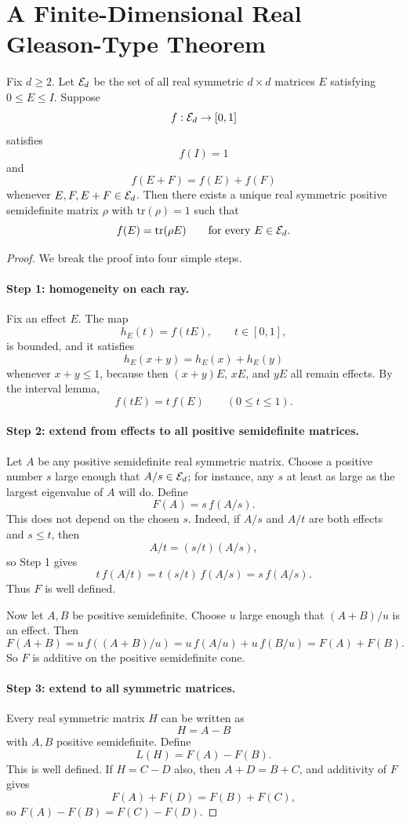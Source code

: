 \section{A Finite-Dimensional Real Gleason-Type Theorem}

\begin{theorem}
Fix $d\ge 2$. Let $\mathcal{E}_d$ be the set of all real symmetric $d\times d$ matrices $E$ satisfying $0\le E\le I$. Suppose
\[
f:\mathcal{E}_d\to [0,1]
\]
satisfies
\[
f(I)=1
\]
and
\[
f(E+F)=f(E)+f(F)
\]
whenever $E,F,E+F\in \mathcal{E}_d$. Then there exists a unique real symmetric positive semidefinite matrix $\rho$ with $\mathrm{tr}(\rho)=1$ such that
\[
f(E)=\mathrm{tr}(\rho E)
\qquad\text{for every }E\in \mathcal{E}_d.
\]
\end{theorem}

\begin{proof}
We break the proof into four simple steps.

\paragraph{Step 1: homogeneity on each ray.}
Fix an effect $E$. The map
\[
h_E(t)=f(tE),\qquad t\in[0,1],
\]
is bounded, and it satisfies
\[
h_E(x+y)=h_E(x)+h_E(y)
\]
whenever $x+y\le 1$, because then $(x+y)E$, $xE$, and $yE$ all remain effects. By the interval lemma,
\[
f(tE)=t\,f(E)\qquad (0\le t\le 1).
\]

\paragraph{Step 2: extend from effects to all positive semidefinite matrices.}
Let $A$ be any positive semidefinite real symmetric matrix. Choose a positive number $s$ large enough that $A/s\in\mathcal{E}_d$; for instance, any $s$ at least as large as the largest eigenvalue of $A$ will do. Define
\[
F(A)=s\,f(A/s).
\]
This does not depend on the chosen $s$. Indeed, if $A/s$ and $A/t$ are both effects and $s\le t$, then
\[
A/t=(s/t)(A/s),
\]
so Step 1 gives
\[
t\,f(A/t)=t\,(s/t)\,f(A/s)=s\,f(A/s).
\]
Thus $F$ is well defined.

Now let $A,B$ be positive semidefinite. Choose $u$ large enough that $(A+B)/u$ is an effect. Then
\[
F(A+B)=u\,f((A+B)/u)=u\,f(A/u)+u\,f(B/u)=F(A)+F(B).
\]
So $F$ is additive on the positive semidefinite cone.

\paragraph{Step 3: extend to all symmetric matrices.}
Every real symmetric matrix $H$ can be written as
\[
H=A-B
\]
with $A,B$ positive semidefinite. Define
\[
L(H)=F(A)-F(B).
\]
This is well defined. If $H=C-D$ also, then $A+D=B+C$, and additivity of $F$ gives
\[
F(A)+F(D)=F(B)+F(C),
\]
so $F(A)-F(B)=F(C)-F(D)$.


\end{proof}
